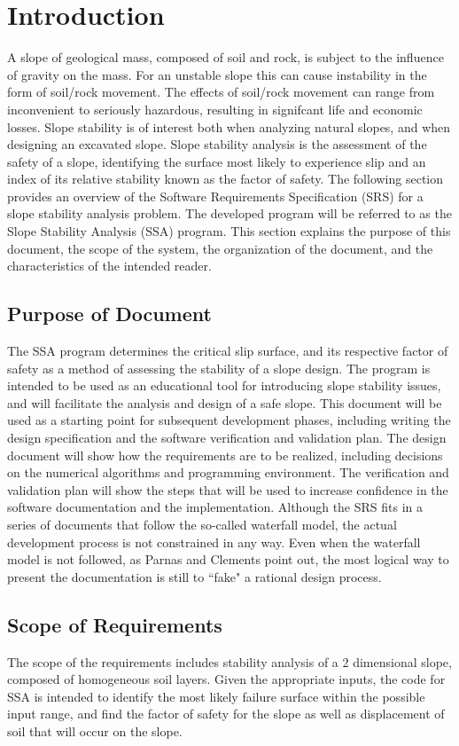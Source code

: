 \documentclass[12pt]{article}
\begin{document}
\section{Introduction}
\label{Sec:Intr}
A slope of geological mass, composed of soil and rock, is subject to the influence of gravity on the mass. For an unstable slope this can cause instability in the form of soil/rock movement. The effects of soil/rock movement can range from inconvenient to seriously hazardous, resulting in signifcant life and economic losses. Slope stability is of interest both when analyzing natural slopes, and when designing an excavated slope. Slope stability analysis is the assessment of the safety of a slope, identifying the surface most likely to experience slip and an index of its relative stability known as the factor of safety.
The following section provides an overview of the Software Requirements Specification (SRS) for a slope stability analysis problem. The developed program will be referred to as the Slope Stability Analysis (SSA) program. This section explains the purpose of this document, the scope of the system, the organization of the document, and the characteristics of the intended reader.
\subsection{Purpose of Document}
\label{Sec:PurpofDocu}
The SSA program determines the critical slip surface, and its respective factor of safety as a method of assessing the stability of a slope design. The program is intended to be used as an educational tool for introducing slope stability issues, and will facilitate the analysis and design of a safe slope.
This document will be used as a starting point for subsequent development phases, including writing the design specification and the software verification and validation plan. The design document will show how the requirements are to be realized, including decisions on the numerical algorithms and programming environment. The verification and validation plan will show the steps that will be used to increase confidence in the software documentation and the implementation. Although the SRS fits in a series of documents that follow the so-called waterfall model, the actual development process is not constrained in any way. Even when the waterfall model is not followed, as Parnas and Clements point out, the most logical way to present the documentation is still to ``fake" a rational design process.
\subsection{Scope of Requirements}
\label{Sec:ScopofRequ}
The scope of the requirements includes stability analysis of a 2 dimensional slope, composed of homogeneous soil layers. Given the appropriate inputs, the code for SSA is intended to identify the most likely failure surface within the possible input range, and find the factor of safety for the slope as well as displacement of soil that will occur on the slope.
\end{document}
